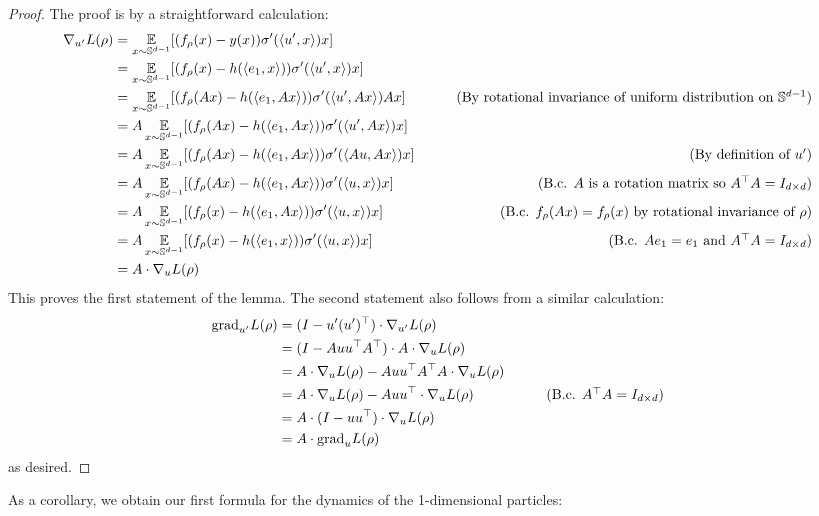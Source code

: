 \begin{proof}
The proof is by a straightforward calculation:
\begin{align}
\nabla_{\u'} L(\rho)
& = \E_{x \sim \bbS^{d - 1}} [(f_\rho(x) - y(x)) \sigma'(\dotp{\u'}{x}) x] \\
& = \E_{x \sim \bbS^{d - 1}} [(f_\rho(x) - \target(\dotp{\e}{x})) \sigma'(\dotp{\u'}{x}) x] \\
& = \E_{x \sim \bbS^{d - 1}} [(f_\rho(Ax) - \target(\dotp{\e}{Ax})) \sigma'(\dotp{\u'}{Ax}) Ax]
& \tag{By rotational invariance of uniform distribution on $\bbS^{d - 1}$} \\
& = A \E_{x \sim \bbS^{d - 1}} [(f_\rho(Ax) - h(\dotp{\e}{Ax})) \sigma'(\dotp{\u'}{Ax}) x] \\
& = A \E_{x \sim \bbS^{d - 1}} [(f_\rho(Ax) - h(\dotp{\e}{Ax})) \sigma'(\dotp{A\u}{Ax}) x]
& \tag{By definition of $\u'$} \\
& = A \E_{x \sim \bbS^{d - 1}} [(f_\rho(Ax) - h(\dotp{\e}{Ax})) \sigma'(\dotp{\u}{x}) x]
& \tag{B.c. $A$ is a rotation matrix so $A^\top A = \ddimId$} \\
& = A \E_{x \sim \bbS^{d - 1}} [(f_\rho(x) - h(\dotp{\e}{Ax})) \sigma'(\dotp{\u}{x}) x]
& \tag{B.c. $f_\rho(Ax) = f_\rho(x)$ by rotational invariance of $\rho$} \\
& = A \E_{x \sim \bbS^{d - 1}} [(f_\rho(x) - h(\dotp{\e}{x})) \sigma'(\dotp{\u}{x}) x]
& \tag{B.c. $A\e = \e$ and $A^\top A = \ddimId$} \\
& = A \cdot \nabla_\u L(\rho)
\end{align}
This proves the first statement of the lemma. The second statement also follows from a similar calculation:
\begin{align}
\pgrad_{\u'} L(\rho)
& = (I - \u' (\u')^\top) \cdot \nabla_{\u'} L(\rho) \\
& = (I - A \u \u^\top A^\top) \cdot A \cdot \nabla_\u L(\rho) \\
& = A \cdot \nabla_\u L(\rho) - A \u \u^\top A^\top A \cdot \nabla_\u L(\rho) \\
& = A \cdot \nabla_\u L(\rho) - A \u \u^\top \cdot \nabla_\u L(\rho)
& \tag{B.c. $A^\top A = \ddimId$} \\
& = A \cdot (I - \u\u^\top) \cdot \nabla_\u L(\rho) \\
& = A \cdot \pgrad_\u L(\rho)
\end{align}
as desired.
\end{proof}

As a corollary, we obtain our first formula for the dynamics of the 1-dimensional particles:

